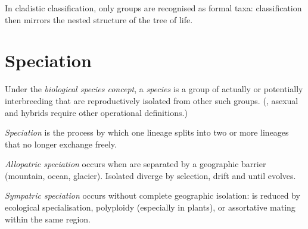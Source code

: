 \begin{proposition}\label{prop:g12:phylogeny-macroevolution:natural}
In cladistic classification, only  groups are recognised as
formal taxa: classification then mirrors the nested structure of the tree
of life.
\end{proposition}
\admitted

\section{Speciation}

\begin{definition}
\label{def:g12:phylogeny-macroevolution:species}
Under the \emph{biological species concept}, a \emph{species} is a group of actually or
potentially interbreeding  that are reproductively isolated
from other such groups. (, asexual  and hybrids require
other operational definitions.)
\end{definition}

\begin{definition}[Speciation]\label{def:g12:phylogeny-macroevolution:speciation}
\emph{Speciation} is the process by which one lineage
splits into two or more lineages that no longer exchange  freely.
\end{definition}

\begin{definition}
\label{def:g12:phylogeny-macroevolution:allopatric}
\emph{Allopatric speciation} occurs when
 are separated by a geographic barrier (mountain, ocean,
glacier). Isolated  diverge by selection, drift and 
until  evolves.
\end{definition}

\begin{definition}
\label{def:g12:phylogeny-macroevolution:sympatric}
\emph{Sympatric speciation} occurs without
complete geographic isolation:  is reduced by ecological
specialisation, polyploidy (especially in plants), or assortative
mating within the same region.
\end{definition}

